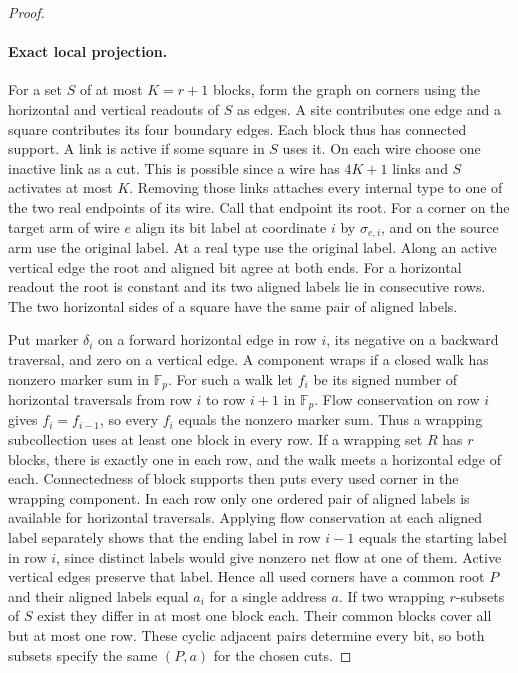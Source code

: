 \documentclass[11pt]{article}
\newcommand{\F}{\mathbb F_p}
\theoremstyle{definition}
\theoremstyle{remark}
\numberwithin{equation}{section}
\begin{document}
\begin{proof}
\paragraph{Exact local projection.}
For a set $S$ of at most $K=r+1$ blocks, form the graph on corners using
the horizontal and vertical readouts of $S$ as edges.
A site contributes one edge and a square contributes its four boundary
edges. Each block thus has connected support. A link is active if some
square in $S$ uses it. On each wire choose one inactive link as a cut.
This is possible since a wire has $4K+1$ links and $S$ activates at
most $K$. Removing those links attaches every internal type to one of
the two real endpoints of its wire. Call that endpoint its root. For
a corner on the target arm of wire $e$ align its bit label at coordinate
$i$ by $\sigma_{e,i}$, and on the source arm use the original label.
At a real type use the original label. Along an active vertical edge
the root and aligned bit agree at both ends.
For a horizontal readout the root is constant and its two aligned
labels lie in consecutive rows. The two horizontal sides of a square
have the same pair of aligned labels.

Put marker $\delta_i$ on a forward horizontal edge in row $i$, its
negative on a backward traversal, and zero on a vertical edge. A
component wraps if a closed walk has nonzero marker sum in $\F$.
For such a walk let $f_i$ be its signed number of horizontal traversals
from row $i$ to row $i+1$ in $\F$. Flow conservation on row $i$ gives
$f_i=f_{i-1}$, so every $f_i$ equals the nonzero marker sum.
Thus a wrapping subcollection uses at least one block in every row.
If a wrapping set $R$ has $r$ blocks, there is exactly one in each row,
and the walk meets a horizontal edge of each. Connectedness of block
supports then puts every used corner in the wrapping component. In each
row only one ordered pair of aligned labels is available for horizontal
traversals. Applying flow conservation at each aligned label separately
shows that the ending label in row $i-1$ equals the starting label in
row $i$, since distinct labels would give nonzero net flow at one of them. Active vertical
edges preserve that label. Hence all used corners have a common root
$P$ and their aligned labels equal $a_i$ for a single address $a$.
If two wrapping $r$-subsets of $S$ exist they differ in at most one
block each. Their common blocks cover all but at most one row. These
cyclic adjacent pairs determine every bit, so both subsets specify the
same $(P,a)$ for the chosen cuts.


\end{proof}
\end{document}
